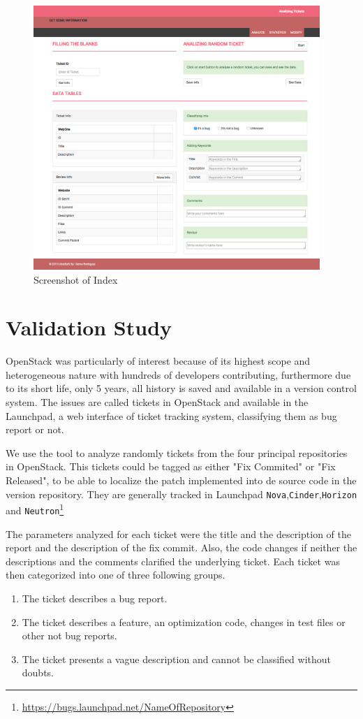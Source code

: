 \documentclass[ifip]{svmult}
\begin{document}
\begin{figure}
\centering
\includegraphics[height=10cm]{index.png}
\caption{Screenshot of Index}
\label{fig:2}       %
\end{figure}


\section{Validation Study}
\label{sec:3}

OpenStack was particularly of interest because of its highest scope and heterogeneous nature with hundreds of developers contributing, furthermore due to its short life, only 5 years, all history is saved and available in a version control system. The issues are called tickets in OpenStack and available in the Launchpad, a web interface of ticket tracking system, classifying them as bug report or not.

We use the tool to analyze randomly tickets from the four principal repositories in OpenStack. This tickets could be tagged as either "Fix Commited" or "Fix Released", to be able to localize the patch implemented into de source code in the version repository. They are generally tracked in Launchpad \texttt{Nova},\texttt{Cinder},\texttt{Horizon} and \texttt{Neutron}\footnote{\url{https://bugs.launchpad.net/NameOfRepository}}

The parameters analyzed for each ticket were the title and the description of the report and the description of the fix commit. Also, the code changes if neither the descriptions and the comments clarified the underlying ticket. Each ticket was then categorized into one of three following groups.
\begin{enumerate}
  \item The ticket describes a bug report.
  \item The ticket describes a feature, an optimization code, changes in test files or other not bug reports.
  \item The ticket presents a vague description and cannot be classified without doubts.
\end{enumerate}
\end{document}
